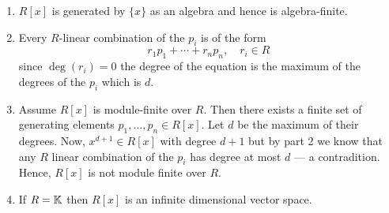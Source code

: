 \documentclass[Notebook.tex]{subfiles}
\begin{document}
\begin{solution}
    \bbni
    \begin{enumerate}
        \item $R[x]$ is generated by $\{x\}$ as an algebra and hence is algebra-finite. 
        
        \item Every $R$-linear combination of the $p_i$ is of the form 
        \[r_1 p_1 + \cdots + r_np_n,  \quad r_i \in R \]
        since $\deg(r_i) = 0$ the degree of the equation is the maximum of the degrees of the $p_i$ which is $d$. 

        \item Assume $R[x]$ is module-finite over $R$. Then there exists a finite set of generating elements $p_1, \ldots, p_n \in R[x]$. Let $d$ be the maximum of their degrees. Now, $x^{d+1} \in R[x]$ with degree $d+1$ but by part 2 we know that any $R$ linear combination of the $p_i$ has degree at most $d$ --- a contradition. Hence, $R[x]$ is not module finite over $R$. 
        
        \item If $R = \mathbb K$ then $R[x]$ is an infinite dimensional vector space. 
    \end{enumerate}
\end{solution}


\newpage 
\end{document}

